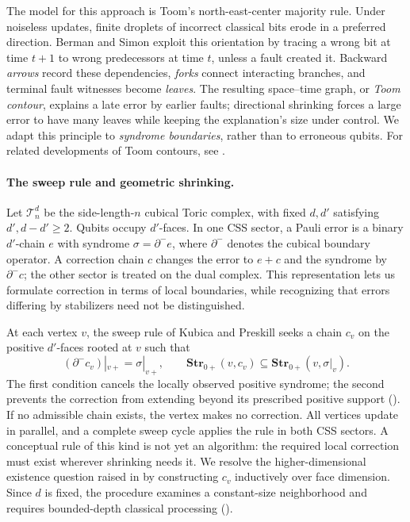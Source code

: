 The model for this approach is Toom's north-east-center majority rule. Under noiseless updates, finite droplets of incorrect classical bits erode in a preferred direction. Berman and Simon \cite{Berman} exploit this orientation by tracing a wrong bit at time $t+1$ to wrong predecessors at time $t$, unless a fault created it. Backward \emph{arrows} record these dependencies, \emph{forks} connect interacting branches, and terminal fault witnesses become \emph{leaves}. The resulting space--time graph, or \emph{Toom contour}, explains a late error by earlier faults; directional shrinking forces a large error to have many leaves while keeping the explanation's size under control. We adapt this principle to \emph{syndrome boundaries}, rather than to erroneous qubits. For related developments of Toom contours, see \cite{swart2026peierlsboundstoomcontours}.

\paragraph{The sweep rule and geometric shrinking.}
Let $\mathcal T_n^d$ be the side-length-$n$ cubical Toric complex, with fixed $d,d'$ satisfying $d',d-d'\geq 2$. Qubits occupy $d'$-faces. In one CSS sector, a Pauli error is a binary $d'$-chain $e$ with syndrome $\sigma=\partial^-e$, where $\partial^-$ denotes the cubical boundary operator. A correction chain $c$ changes the error to $e+c$ and the syndrome by $\partial^-c$; the other sector is treated on the dual complex. This representation lets us formulate correction in terms of local boundaries, while recognizing that errors differing by stabilizers need not be distinguished.

At each vertex $v$, the sweep rule of Kubica and Preskill \cite{Kubica_2019} seeks a chain $c_v$ on the positive $d'$-faces rooted at $v$ such that
\begin{equation*}
  (\partial^-c_v)|_{v+}=\sigma|_{v+},
  \qquad
  \textbf{Str}_{0+}(v,c_v)\subseteq\textbf{Str}_{0+}(v,\sigma|_{v}).
\end{equation*}
The first condition cancels the locally observed positive syndrome; the second prevents the correction from extending beyond its prescribed positive support (). If no admissible chain exists, the vertex makes no correction. All vertices update in parallel, and a complete sweep cycle applies the rule in both CSS sectors. A conceptual rule of this kind is not yet an algorithm: the required local correction must exist wherever shrinking needs it. We resolve the higher-dimensional existence question raised in \cite{Kubica_2019} by constructing $c_v$ inductively over face dimension. Since $d$ is fixed, the procedure examines a constant-size neighborhood and requires bounded-depth classical processing ().

